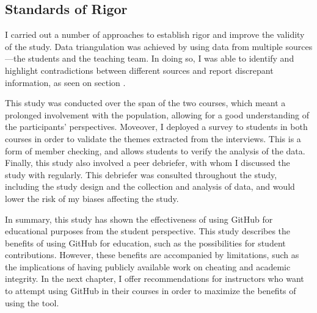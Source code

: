 \subsection{Standards of Rigor}
I carried out a number of approaches to establish rigor and improve the validity of the study\cite{runeson2012case}. Data triangulation was achieved by using data from multiple sources---the students and the teaching team. In doing so, I was able to identify and highlight contradictions between different sources and report discrepant information, as seen on section .

This study was conducted over the span of the two courses, which meant a prolonged involvement with the population, allowing for a good understanding of the participants' perspectives. Moveover, I deployed a survey to students in both courses in order to validate the themes extracted from the interviews. This is a form of member checking, and allows students to verify the analysis of the data. Finally, this study also involved a peer debriefer, with whom I discussed the study with regularly. This debriefer was consulted throughout the study, including the study design and the collection and analysis of data, and would lower the risk of my biases affecting the study.

In summary, this study has shown the effectiveness of using GitHub for educational purposes from the student perspective. This study describes the benefits of using GitHub for education, such as the possibilities for student contributions. However, these benefits are accompanied by limitations, such as the implications of having publicly available work on cheating and academic integrity. In the next chapter, I offer recommendations for instructors who want to attempt using GitHub in their courses in order to maximize the benefits of using the tool.
